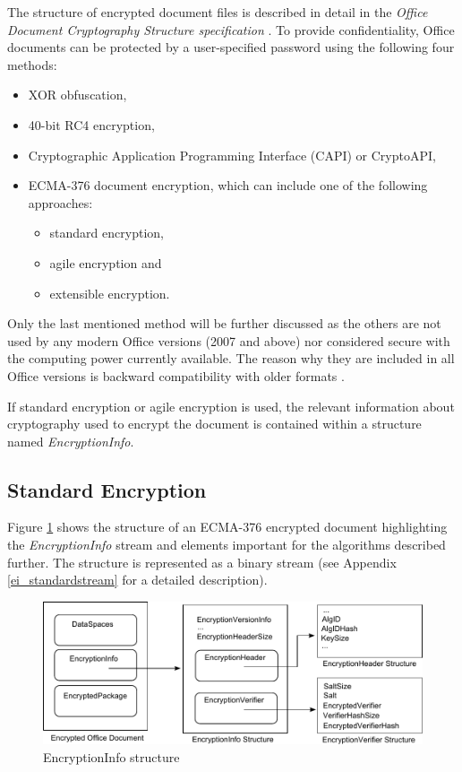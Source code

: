 \documentclass[11pt,oneside]{fithesis2}
\begin{document}
The structure of encrypted document files is described in detail in the \textit{Office Document Cryptography Structure specification} \cite{msoffcrypto}. To provide confidentiality, Office documents can be protected by a user-specified password using the following four methods:
\begin{itemize}
\setlength\itemsep{0.1em}
\item{XOR obfuscation,}
\item{40-bit RC4 encryption,}
\item{Cryptographic Application Programming Interface (CAPI) or CryptoAPI,}
\item{ECMA-376 document encryption, which can include one of the following approaches: }
	\begin{itemize}
	\setlength\itemsep{0.1em}
	\item{standard encryption,}
	\item{agile encryption and}
	\item{extensible encryption.}
	\end{itemize}
\end{itemize}

Only the last mentioned method will be further discussed as the others are not used by any modern Office versions (2007 and above) nor considered secure with the computing power currently available. The reason why they are included in all Office versions is backward compatibility with older formats \cite{msoffcrypto}.

If standard encryption or agile encryption is used, the relevant information about cryptography used to encrypt the document is contained within a structure named \textit{EncryptionInfo}.

\subsection{Standard Encryption} \label{msoff_standard_enc}

Figure \ref{keys_length} shows the structure of an ECMA-376 encrypted document highlighting the \textit{EncryptionInfo} stream and elements important for the algorithms described further. The structure is represented as a binary stream (see Appendix \ref{ei_standardstream} for a detailed description).

\begin{figure}[ht]
	\centering
	\includegraphics[width=1\textwidth]{figures/ei_struct.pdf}
	\caption{EncryptionInfo structure}
	\label{keys_length}
\end{figure}
\end{document}
